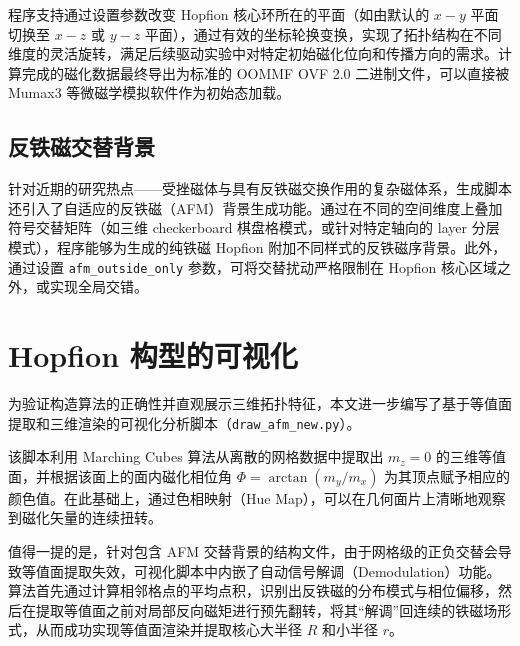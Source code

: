 程序支持通过设置参数改变 Hopfion 核心环所在的平面（如由默认的 $x-y$ 平面切换至 $x-z$ 或 $y-z$ 平面），通过有效的坐标轮换变换，实现了拓扑结构在不同维度的灵活旋转，满足后续驱动实验中对特定初始磁化位向和传播方向的需求。计算完成的磁化数据最终导出为标准的 OOMMF OVF 2.0 二进制文件，可以直接被 Mumax3 等微磁学模拟软件作为初始态加载。

\subsection{反铁磁交替背景}
针对近期的研究热点——受挫磁体与具有反铁磁交换作用的复杂磁体系，生成脚本还引入了自适应的反铁磁（AFM）背景生成功能。通过在不同的空间维度上叠加符号交替矩阵（如三维 checkerboard 棋盘格模式，或针对特定轴向的 layer 分层模式），程序能够为生成的纯铁磁 Hopfion 附加不同样式的反铁磁序背景。此外，通过设置 \texttt{afm\_outside\_only} 参数，可将交替扰动严格限制在 Hopfion 核心区域之外，或实现全局交错。

\section{Hopfion 构型的可视化}

为验证构造算法的正确性并直观展示三维拓扑特征，本文进一步编写了基于等值面提取和三维渲染的可视化分析脚本（\texttt{draw\_afm\_new.py}）。

该脚本利用 Marching Cubes 算法从离散的网格数据中提取出 $m_z=0$ 的三维等值面，并根据该面上的面内磁化相位角 $\Phi = \arctan(m_y/m_x)$ 为其顶点赋予相应的颜色值。在此基础上，通过色相映射（Hue Map），可以在几何面片上清晰地观察到磁化矢量的连续扭转。

值得一提的是，针对包含 AFM 交替背景的结构文件，由于网格级的正负交替会导致等值面提取失效，可视化脚本中内嵌了自动信号解调（Demodulation）功能。算法首先通过计算相邻格点的平均点积，识别出反铁磁的分布模式与相位偏移，然后在提取等值面之前对局部反向磁矩进行预先翻转，将其“解调”回连续的铁磁场形式，从而成功实现等值面渲染并提取核心大半径 $R$ 和小半径 $r$。

